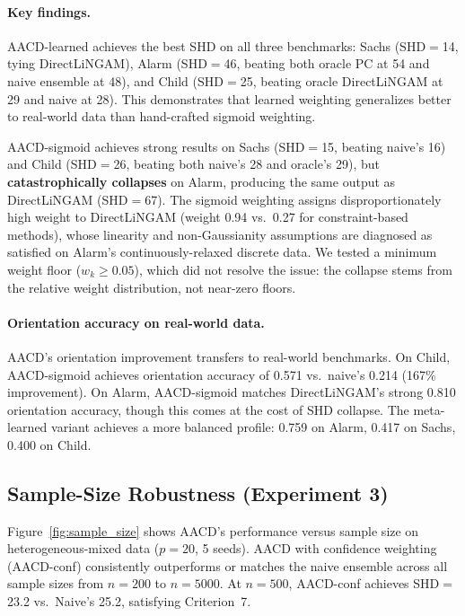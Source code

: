 \documentclass{article}
\newcommand{\aacd}{\textsc{AACD}}
\begin{document}
\paragraph{Key findings.} \aacd{}-learned achieves the best SHD on all three benchmarks: Sachs (SHD$=$14, tying DirectLiNGAM), Alarm (SHD$=$46, beating both oracle PC at 54 and naive ensemble at 48), and Child (SHD$=$25, beating oracle DirectLiNGAM at 29 and naive at 28). This demonstrates that learned weighting generalizes better to real-world data than hand-crafted sigmoid weighting.

\aacd{}-sigmoid achieves strong results on Sachs (SHD$=$15, beating naive's 16) and Child (SHD$=$26, beating both naive's 28 and oracle's 29), but \textbf{catastrophically collapses} on Alarm, producing the same output as DirectLiNGAM (SHD$=$67). The sigmoid weighting assigns disproportionately high weight to DirectLiNGAM (weight 0.94 vs.\ 0.27 for constraint-based methods), whose linearity and non-Gaussianity assumptions are diagnosed as satisfied on Alarm's continuously-relaxed discrete data. We tested a minimum weight floor ($w_k \geq 0.05$), which did not resolve the issue: the collapse stems from the relative weight distribution, not near-zero floors.

\paragraph{Orientation accuracy on real-world data.} \aacd{}'s orientation improvement transfers to real-world benchmarks. On Child, \aacd{}-sigmoid achieves orientation accuracy of 0.571 vs.\ naive's 0.214 (167\% improvement). On Alarm, \aacd{}-sigmoid matches DirectLiNGAM's strong 0.810 orientation accuracy, though this comes at the cost of SHD collapse. The meta-learned variant achieves a more balanced profile: 0.759 on Alarm, 0.417 on Sachs, 0.400 on Child.

\subsection{Sample-Size Robustness (Experiment 3)}

Figure~\ref{fig:sample_size} shows \aacd{}'s performance versus sample size on heterogeneous-mixed data ($p{=}20$, 5 seeds). \aacd{} with confidence weighting (AACD-conf) consistently outperforms or matches the naive ensemble across all sample sizes from $n{=}200$ to $n{=}5000$. At $n{=}500$, AACD-conf achieves SHD$=$23.2 vs.\ Naive's 25.2, satisfying Criterion~7.
\end{document}
